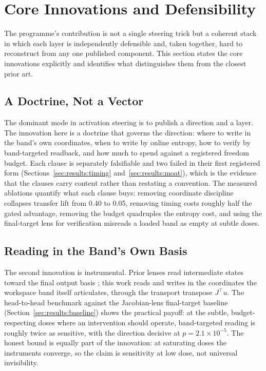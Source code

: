 \section{Core Innovations and Defensibility}
\label{sec:moat}

The programme's contribution is not a single steering trick but a coherent stack in which each layer is independently defensible and, taken together, hard to reconstruct from any one published component. This section states the core innovations explicitly and identifies what distinguishes them from the closest prior art.

\subsection{A Doctrine, Not a Vector}

The dominant mode in activation steering is to publish a direction and a layer. The innovation here is a doctrine that governs the direction: where to write in the band's own coordinates, when to write by online entropy, how to verify by band-targeted readback, and how much to spend against a registered freedom budget. Each clause is separately falsifiable and two failed in their first registered form (Sections~\ref{sec:results:timing} and~\ref{sec:results:moat}), which is the evidence that the clauses carry content rather than restating a convention. The measured ablations quantify what each clause buys: removing coordinate discipline collapses transfer lift from 0.40 to 0.05, removing timing costs roughly half the gated advantage, removing the budget quadruples the entropy cost, and using the final-target lens for verification misreads a loaded band as empty at subtle doses.

\subsection{Reading in the Band's Own Basis}

The second innovation is instrumental. Prior lenses read intermediate states toward the final output basis \cite{Nostalgebraist2020,Belrose2023}; this work reads and writes in the coordinates the workspace band itself articulates, through the transport transpose $J^{\top}u$. The head-to-head benchmark against the Jacobian-lens final-target baseline (Section~\ref{sec:results:baseline}) shows the practical payoff: at the subtle, budget-respecting doses where an intervention should operate, band-targeted reading is roughly twice as sensitive, with the direction decisive at $p=2.1\times10^{-5}$. The honest bound is equally part of the innovation: at saturating doses the instruments converge, so the claim is sensitivity at low dose, not universal invisibility.

